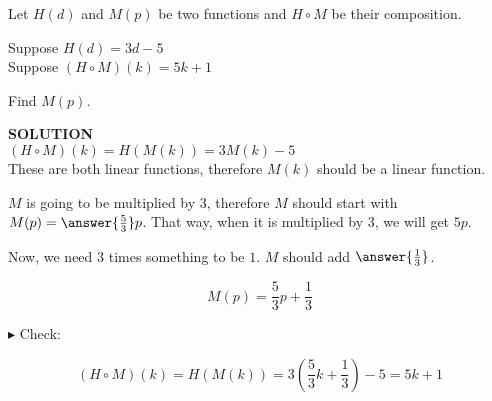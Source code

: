 \documentclass{ximera}
\begin{document}
\begin{example}


Let $H(d)$ and $M(p)$ be two functions and $H \circ M$ be their composition.


Suppose $H(d) = 3 d - 5$ \\

Suppose $(H \circ M)(k) = 5 k + 1$


Find $M(p)$.



\textbf{\textcolor{purple!50!blue!90!black}{SOLUTION}} \\




$(H \circ M)(k) = H(M(k)) = 3 M(k) - 5 $  \\




These are both linear functions, therefore $M(k)$ should be a linear function.


$M$ is going to be multiplied by $3$, therefore $M$ should start with $M(p) = \answer{\frac{5}{3}}p$. That way, when it is multiplied by $3$, we will get $5p$.




Now, we need $3$ times something to be $1$.  $M$ should add $\answer{\frac{1}{3}}$.

\[  M(p) =    \frac{5}{3} p +     \frac{1}{3} \]



$\blacktriangleright$ Check: 


\[    (H \circ M)(k) = H(M(k)) = 3 \left( \frac{5}{3} k + \frac{1}{3} \right) - 5 =    5 k + 1    \]

\end{example}
\end{document}
